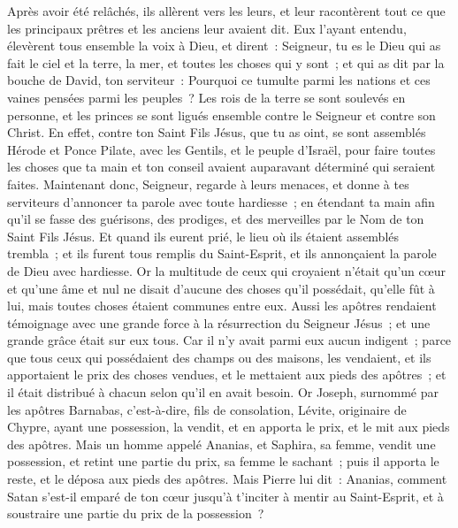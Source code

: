 \begin{multicols}{2}
Après avoir été relâchés, ils allèrent vers les leurs, et leur racontèrent tout ce que les principaux prêtres et les anciens leur avaient dit.
Eux l'ayant entendu, élevèrent tous ensemble la voix à Dieu, et dirent~: Seigneur, tu es le Dieu qui as fait le ciel et la terre, la mer, et toutes les choses qui y sont~;
et qui as dit par la bouche de David, ton serviteur~: Pourquoi ce tumulte parmi les nations et ces vaines pensées parmi les peuples~?
Les rois de la terre se sont soulevés en personne, et les princes se sont ligués ensemble contre le Seigneur et contre son Christ.
En effet, contre ton Saint Fils Jésus, que tu as oint, se sont assemblés Hérode et Ponce Pilate, avec les Gentils, et le peuple d'Israël,
pour faire toutes les choses que ta main et ton conseil avaient auparavant déterminé qui seraient faites. 
Maintenant donc, Seigneur, regarde à leurs menaces, et donne à tes serviteurs d'annoncer ta parole avec toute hardiesse~;
en étendant ta main afin qu'il se fasse des guérisons, des prodiges, et des merveilles par le Nom de ton Saint Fils Jésus.
Et quand ils eurent prié, le lieu où ils étaient assemblés trembla~; et ils furent tous remplis du Saint-Esprit, et ils annonçaient la parole de Dieu avec hardiesse.
Or la multitude de ceux qui croyaient n'était qu'un cœur et qu'une âme et nul ne disait d'aucune des choses qu'il possédait, qu'elle fût à lui, mais toutes choses étaient communes entre eux.
Aussi les apôtres rendaient témoignage avec une grande force à la résurrection du Seigneur Jésus~; et une grande grâce était sur eux tous.
Car il n'y avait parmi eux aucun indigent~; parce que tous ceux qui possédaient des champs ou des maisons, les vendaient, et ils apportaient le prix des choses vendues,
et le mettaient aux pieds des apôtres~; et il était distribué à chacun selon qu'il en avait besoin.
Or Joseph, surnommé par les apôtres Barnabas, c'est-à-dire, fils de consolation, Lévite, originaire de Chypre,
ayant une possession, la vendit, et en apporta le prix, et le mit aux pieds des apôtres.
\VerseOne{}Mais un homme appelé Ananias, et Saphira, sa femme, vendit une possession,
et retint une partie du prix, sa femme le sachant~; puis il apporta le reste, et le déposa aux pieds des apôtres.
Mais Pierre lui dit~: Ananias, comment Satan s'est-il emparé de ton cœur jusqu'à t'inciter à mentir au Saint-Esprit, et à soustraire une partie du prix de la possession~?

\end{multicols}
